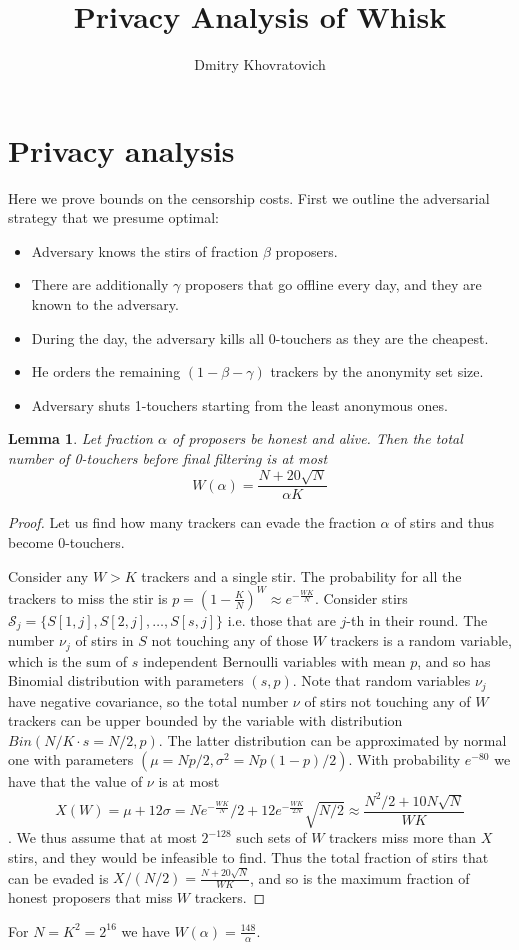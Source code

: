 \documentclass{article}
\title{Privacy Analysis of Whisk}
\author{ Dmitry Khovratovich}
\newtheorem{lemma}{Lemma}
\begin{document}
\maketitle

\section{Privacy analysis}


Here we prove bounds on the censorship costs. First we outline the adversarial strategy that we presume optimal:
\begin{itemize}
    \item Adversary knows the stirs of fraction $\beta$ proposers.
    \item There are additionally $\gamma$ proposers that go offline every day, and they are known to the adversary.
    \item During the day, the adversary kills all 0-touchers as they are the cheapest.
    \item He orders the remaining $(1-\beta-\gamma)$ trackers by the anonymity set size. 
    \item Adversary shuts 1-touchers starting from the least anonymous ones.
\end{itemize}

\begin{lemma}
Let fraction $\alpha$ of proposers be honest and alive. Then the total number of 0-touchers before final filtering is at most $$
W(\alpha) =\frac{N+20\sqrt{N}}{\alpha K}
$$
\end{lemma}
\begin{proof} Let us find how many trackers can evade the fraction $\alpha$ of stirs and thus become 0-touchers.

Consider any $W>K$ trackers and a single stir. The probability for all the trackers to miss the stir is $p=(1-\frac{K}{N})^W\approx e^{-\frac{WK}{N}}$. Consider  stirs $\mathcal{S}_j=\{S[1,j],S[2,j],\ldots,S[s,j]\}$ i.e. those  that are $j$-th in their round. The number $\nu_j$ of stirs in $S$ not touching any of those $W$ trackers is a random variable, which is the sum of $s$ independent Bernoulli variables with mean $p$, and so has Binomial distribution with parameters $(s,p)$. Note that random variables $\nu_j$  have negative covariance, so the total number $\nu$ of stirs not touching any of $W$ trackers  can be upper bounded by the variable with distribution $Bin(N/K\cdot s= N/2,p)$. The latter distribution can be approximated by normal one with parameters $(\mu=Np/2,\sigma^2=Np(1-p)/2)$.  With probability $e^{-80}$ we have that  the value of $\nu$ is at most $$
X(W)=\mu+12\sigma = Ne^{-\frac{WK}{N}}/2+12e^{-\frac{WK}{2N}}\sqrt{N/2}\approx \frac{N^2/2+10N\sqrt{N}}{WK}
$$. We thus assume that at most $2^{-128}$ such sets of $W$ trackers miss more than $X$ stirs, and they would be infeasible to find. Thus the total fraction of stirs that can be evaded is $X/(N/2) = \frac{N+20\sqrt{N}}{WK}$, and so is  the maximum fraction of honest proposers that miss $W$ trackers.
\end{proof}
For $N = K^2 = 2^{16}$ we have $W(
\alpha) = \frac{148}{\alpha}$.
\end{document}
